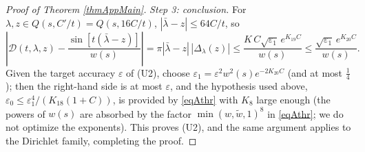 \documentclass[11pt,twoside,reqno]{amsart}
\def\ti{\tilde}
\def\DD{{\mathcal{D}}}
\def\e{\varepsilon}
\def\DD{\Delta}
\def\l{\lambda}
\theoremstyle{plain}
\numberwithin{equation}{section}
\begin{document}
\begin{proof}[Proof of Theorem \ref{thmAppMain}]
{\it Step 3: conclusion.} For $\l,z\in Q(s,C'/t)=Q(s,16C/t)$, $|\bar\l-z|\leq64C/t$, so
$$\left|{\mathcal D}(t,\l,z)-\frac{\sin[t(\bar\l-z)]}{w(s)}\right|=\pi|\bar\l-z|\,|\DD_\l(z)|\leq\frac{K\,C\sqrt{\e_1}\,e^{K_{19}C}}{w(s)}\leq\frac{\sqrt{\e_1}\,e^{K_{20}C}}{w(s)} .$$
Given the target accuracy $\e$ of (U2), choose $\e_1=\e^2w^2(s)e^{-2K_{20}C}$ (and at most $\tfrac14$); then the right-hand side is at most $\e$, and the hypothesis used above, $\e_0\leq\e_1^4/(K_{18}(1+C))$, is provided by \eqref{eqAthr} with $K_8$ large enough (the powers of $w(s)$ are absorbed by the factor $\min(w,\ti w,1)^{8}$ in \eqref{eqAthr}; we do not optimize the exponents). This proves (U2), and the same argument applies to the Dirichlet family, completing the proof.
\end{proof}




\newpage
\end{document}
